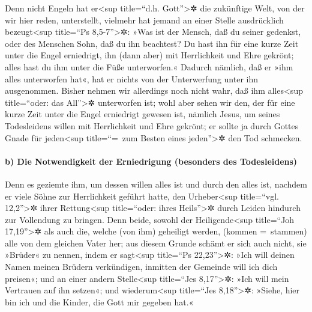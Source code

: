  Denn nicht Engeln hat er\textless sup title=``d.h.
Gott''\textgreater✲ die zukünftige Welt, von der wir hier reden,
unterstellt,  vielmehr hat jemand an einer Stelle
ausdrücklich bezeugt\textless sup title=``Ps 8,5-7''\textgreater✲: »Was
ist der Mensch, daß du seiner gedenkst, oder des Menschen Sohn, daß du
ihn beachtest?  Du hast ihn für eine kurze Zeit unter die
Engel erniedrigt, ihn (dann aber) mit Herrlichkeit und Ehre gekrönt;
 alles hast du ihm unter die Füße unterworfen.« Dadurch
nämlich, daß er »ihm alles unterworfen hat«, hat er nichts von der
Unterwerfung unter ihn ausgenommen. Bisher nehmen wir allerdings noch
nicht wahr, daß ihm alles\textless sup title=``oder: das
All''\textgreater✲ unterworfen ist;  wohl aber sehen wir
den, der für eine kurze Zeit unter die Engel erniedrigt gewesen ist,
nämlich Jesus, um seines Todesleidens willen mit Herrlichkeit und Ehre
gekrönt; er sollte ja durch Gottes Gnade für jeden\textless sup
title=``=~zum Besten eines jeden''\textgreater✲ den Tod schmecken.

\hypertarget{b-die-notwendigkeit-der-erniedrigung-besonders-des-todesleidens}{%
\paragraph{b) Die Notwendigkeit der Erniedrigung (besonders des
Todesleidens)}\label{b-die-notwendigkeit-der-erniedrigung-besonders-des-todesleidens}}

 Denn es geziemte ihm, um dessen willen alles ist und
durch den alles ist, nachdem er viele Söhne zur Herrlichkeit geführt
hatte, den Urheber\textless sup title=``vgl. 12,2''\textgreater✲ ihrer
Rettung\textless sup title=``oder: ihres Heils''\textgreater✲ durch
Leiden hindurch zur Vollendung zu bringen.  Denn beide,
sowohl der Heiligende\textless sup title=``Joh 17,19''\textgreater✲ als
auch die, welche (von ihm) geheiligt werden, (kommen =~stammen) alle von
dem gleichen Vater her; aus diesem Grunde schämt er sich auch nicht, sie
»Brüder« zu nennen,  indem er sagt\textless sup
title=``Ps 22,23''\textgreater✲: »Ich will deinen Namen meinen Brüdern
verkündigen, inmitten der Gemeinde will ich dich preisen«;
 und an einer andern Stelle\textless sup title=``Jes
8,17''\textgreater✲: »Ich will mein Vertrauen auf ihn setzen«; und
wiederum\textless sup title=``Jes 8,18''\textgreater✲: »Siehe, hier bin
ich und die Kinder, die Gott mir gegeben hat.«

